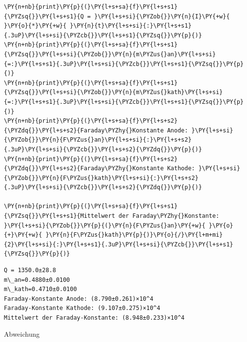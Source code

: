 \begin{tcolorbox}[breakable, size=fbox, boxrule=1pt, pad at break*=1mm,colback=cellbackground, colframe=cellborder]
\begin{Verbatim}[commandchars=\\\{\}]
\PY{n+nb}{print}\PY{p}{(}\PY{l+s+sa}{f}\PY{l+s+s1}{\PYZsq{}}\PY{l+s+s1}{Q = }\PY{l+s+si}{\PYZob{}}\PY{n}{I}\PY{+w}{ }\PY{o}{*}\PY{+w}{ }\PY{n}{t}\PY{l+s+si}{:}\PY{l+s+s1}{.3uP}\PY{l+s+si}{\PYZcb{}}\PY{l+s+s1}{\PYZsq{}}\PY{p}{)}
\PY{n+nb}{print}\PY{p}{(}\PY{l+s+sa}{f}\PY{l+s+s1}{\PYZsq{}}\PY{l+s+si}{\PYZob{}}\PY{n}{m\PYZus{}an}\PY{l+s+si}{=:}\PY{l+s+s1}{.3uP}\PY{l+s+si}{\PYZcb{}}\PY{l+s+s1}{\PYZsq{}}\PY{p}{)}
\PY{n+nb}{print}\PY{p}{(}\PY{l+s+sa}{f}\PY{l+s+s1}{\PYZsq{}}\PY{l+s+si}{\PYZob{}}\PY{n}{m\PYZus{}kath}\PY{l+s+si}{=:}\PY{l+s+s1}{.3uP}\PY{l+s+si}{\PYZcb{}}\PY{l+s+s1}{\PYZsq{}}\PY{p}{)}
\PY{n+nb}{print}\PY{p}{(}\PY{l+s+sa}{f}\PY{l+s+s2}{\PYZdq{}}\PY{l+s+s2}{Faraday\PYZhy{}Konstante Anode: }\PY{l+s+si}{\PYZob{}}\PY{n}{F\PYZus{}an}\PY{l+s+si}{:}\PY{l+s+s2}{.3uP}\PY{l+s+si}{\PYZcb{}}\PY{l+s+s2}{\PYZdq{}}\PY{p}{)}
\PY{n+nb}{print}\PY{p}{(}\PY{l+s+sa}{f}\PY{l+s+s2}{\PYZdq{}}\PY{l+s+s2}{Faraday\PYZhy{}Konstante Kathode: }\PY{l+s+si}{\PYZob{}}\PY{n}{F\PYZus{}kath}\PY{l+s+si}{:}\PY{l+s+s2}{.3uP}\PY{l+s+si}{\PYZcb{}}\PY{l+s+s2}{\PYZdq{}}\PY{p}{)}

\PY{n+nb}{print}\PY{p}{(}\PY{l+s+sa}{f}\PY{l+s+s1}{\PYZsq{}}\PY{l+s+s1}{Mittelwert der Faraday\PYZhy{}Konstante: }\PY{l+s+si}{\PYZob{}}\PY{p}{(}\PY{n}{F\PYZus{}an}\PY{+w}{ }\PY{o}{+}\PY{+w}{ }\PY{n}{F\PYZus{}kath}\PY{p}{)}\PY{o}{/}\PY{l+m+mi}{2}\PY{l+s+si}{:}\PY{l+s+s1}{.3uP}\PY{l+s+si}{\PYZcb{}}\PY{l+s+s1}{\PYZsq{}}\PY{p}{)}
\end{Verbatim}
\end{tcolorbox}

    \begin{Verbatim}[commandchars=\\\{\}]
Q = 1350.0±28.8
m\_an=0.4880±0.0100
m\_kath=0.4710±0.0100
Faraday-Konstante Anode: (8.790±0.261)×10^4
Faraday-Konstante Kathode: (9.107±0.275)×10^4
Mittelwert der Faraday-Konstante: (8.948±0.233)×10^4
    \end{Verbatim}

    Abweichung

